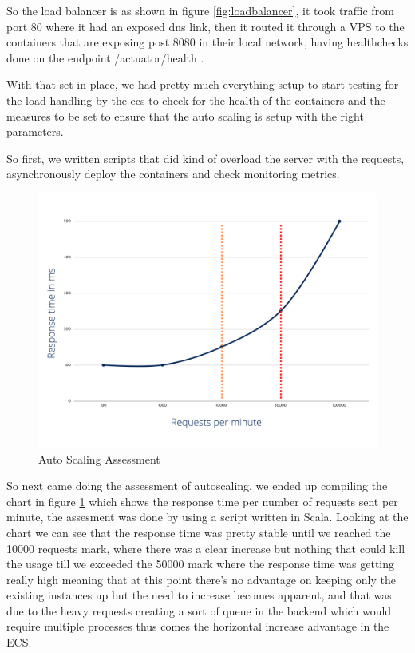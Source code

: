 So the load balancer is as shown in figure \ref{fig:loadbalancer}, it took traffic from
port 80 where it had an exposed dns link, then it routed it through a VPS to the
containers that are exposing post 8080 in their local network, having healthchecks
done on the endpoint /actuator/health .

With that set in place, we had pretty much everything setup to start testing for the
load handling by the ecs to check for the health of the containers and the measures
to be set to ensure that the auto scaling is setup with the right parameters.

So first, we written scripts that did kind of overload the server with the requests,
asynchronously deploy the containers and check monitoring metrics.

\begin{figure}[!ht]
    \centering
    \includegraphics[width=\textwidth]{images/assesment_autoscaling.png}
    \caption{Auto Scaling Assessment}
    \label{fig:autoscaling_assessment}
\end{figure}

So next came doing the assessment of autoscaling, we ended up compiling the chart
in figure \ref{fig:autoscaling_assessment} which shows the response time per
number of requests sent per minute, the assesment was done by using a script
written in Scala.
Looking at the chart we can see that the response time was pretty stable until
we reached the 10000 requests mark, where there was a clear increase but nothing
that could kill the usage till we exceeded the 50000 mark where the response time
was getting really high meaning that at this point there's no advantage on keeping
only the existing instances up but the need to increase becomes apparent, and that
was due to the heavy requests creating a sort of queue in the backend which would
require multiple processes thus comes the horizontal increase advantage in the ECS.

